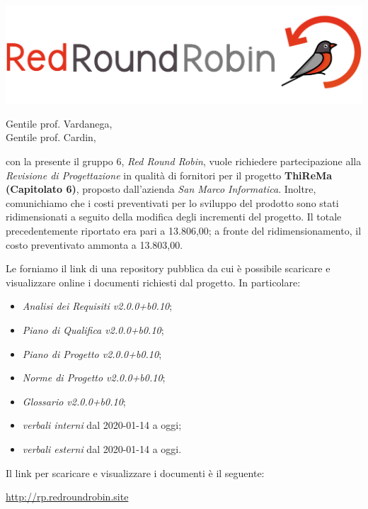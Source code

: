 \documentclass[12pt]{letter}
\date{09 marzo 2020}
\begin{document}
\begin{letter}{ }

\includegraphics[scale=0.17]{images/logo.png}

\opening{Gentile prof. Vardanega,\\ Gentile prof. Cardin, }

con la presente il gruppo 6, \textit{Red Round Robin}, vuole richiedere partecipazione alla \textit{Revisione di Progettazione} in qualità di fornitori per il progetto \textbf{ThiReMa (Capitolato 6)}, proposto dall'azienda \textit{San Marco Informatica}.
Inoltre, comunichiamo che i costi preventivati per lo sviluppo del prodotto sono stati ridimensionati a seguito della modifica degli incrementi del progetto. Il totale precedentemente riportato era pari a \EUR{}13.806,00; a fronte del ridimensionamento, il costo preventivato ammonta a \EUR{}13.803,00.

Le forniamo il link di una repository pubblica da cui è possibile scaricare e visualizzare online i documenti richiesti dal progetto.
In particolare:

\begin{itemize}
	\item \textit{Analisi dei Requisiti v2.0.0+b0.10};
	\item \textit{Piano di Qualifica v2.0.0+b0.10};
	\item \textit{Piano di Progetto v2.0.0+b0.10};
	\item \textit{Norme di Progetto v2.0.0+b0.10};
	\item \textit{Glossario v2.0.0+b0.10};
	\item \textit{verbali interni} dal 2020-01-14 a oggi;
	\item \textit{verbali esterni} dal 2020-01-14 a oggi.
\end{itemize}

\newpage

Il link per scaricare e visualizzare i documenti è il seguente:

\begin{center}
	\href{https://drive.google.com/}{http://rp.redroundrobin.site}
\end{center}



\end{letter}
\end{document}
